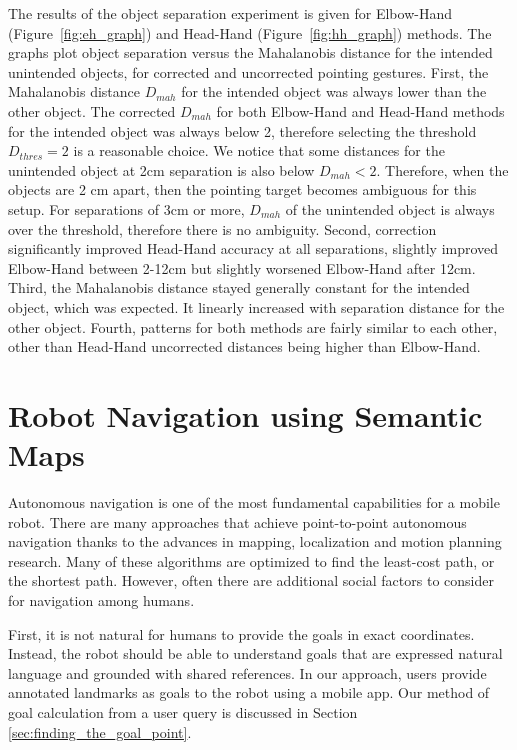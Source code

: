 \documentclass[3p]{elsarticle}
\begin{document}
The results of the object separation experiment is given for Elbow-Hand (Figure~\ref{fig:eh_graph}) and Head-Hand (Figure~\ref{fig:hh_graph}) methods. The graphs plot object separation versus the Mahalanobis distance for the intended unintended objects, for corrected and uncorrected pointing gestures. First, the Mahalanobis distance $D_{mah}$ for the intended object was always lower than the other object. The corrected $D_{mah}$ for both Elbow-Hand and Head-Hand methods for the intended object was always below 2, therefore selecting the threshold $D_{thres}=2$ is a reasonable choice. We notice that some distances for the unintended object at 2cm separation is also below $D_{mah}<2$. Therefore, when the objects are 2 cm apart, then the pointing target becomes ambiguous for this setup. For separations of 3cm or more, $D_{mah}$ of the unintended object is always over the threshold, therefore there is no ambiguity. Second, correction significantly improved Head-Hand accuracy at all separations, slightly improved Elbow-Hand between 2-12cm but slightly worsened Elbow-Hand after 12cm. Third, the Mahalanobis distance stayed generally constant for the intended object, which was expected. It linearly increased with separation distance for the other object. Fourth, patterns for both methods are fairly similar to each other, other than Head-Hand uncorrected distances being higher than Elbow-Hand.


\section{Robot Navigation using Semantic Maps}
\label{sec:robot_navigation}


Autonomous navigation is one of the most fundamental capabilities for a mobile robot. There are many approaches that achieve point-to-point autonomous navigation thanks to the advances in mapping, localization and motion planning research. Many of these algorithms are optimized to find the least-cost path, or the shortest path. However, often there are additional social factors to consider for navigation among humans. 

First, it is not natural for humans to provide the goals in exact coordinates. Instead, the robot should be able to understand goals that are expressed natural language and grounded with shared references. In our approach, users provide annotated landmarks as goals to the robot using a mobile app. Our method of goal calculation from a user query is discussed in Section \ref{sec:finding_the_goal_point}.
\end{document}
